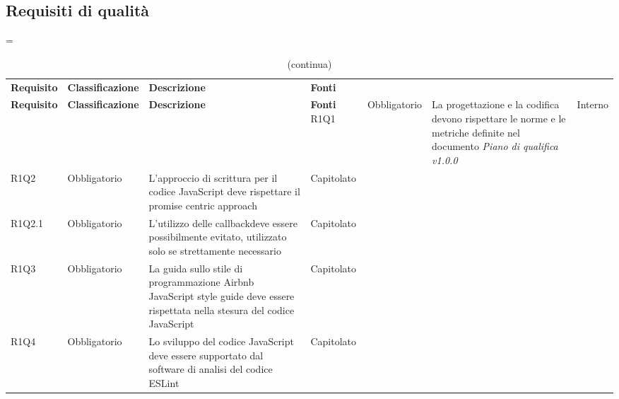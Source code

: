 \subsection{Requisiti di qualità}

\LTcapwidth=\linewidth
\begin{longtable}{ >{\centering}p{} >{\centering}p{}
		>{\raggedright}p{} >{\centering}p{}}
	\caption{Tabella dei requisiti di qualità}\\
	\rowcolorhead 
	\textbf{\color{white}Requisito} 
	& \textbf{\color{white}Classificazione} 
	& \centering\textbf{\color{white}Descrizione}
	& \textbf{\color{white}Fonti} 
	\endfirsthead
	\caption[]{(continua)}\\
	\rowcolorhead 
	\textbf{\color{white}Requisito} 
	& \textbf{\color{white}Classificazione} 
	& \centering\textbf{\color{white}Descrizione}
	& \textbf{\color{white}Fonti} 
	\endhead
	R1Q1	&	Obbligatorio	&	La progettazione e la codifica devono rispettare le norme e le metriche definite nel documento \textit{Piano di qualifica v1.0.0}	&	Interno	\tabularnewline
	R1Q2	&	Obbligatorio	&	L’approccio di scrittura per il codice JavaScript deve rispettare il promise centric approach	&	Capitolato	\tabularnewline
	R1Q2.1	&	Obbligatorio	&	L'utilizzo delle callback\glosp deve essere possibilmente evitato, utilizzato solo se strettamente necessario	&	Capitolato	\tabularnewline
	R1Q3	&	Obbligatorio	&	La guida sullo stile di programmazione Airbnb JavaScript style guide deve essere rispettata nella stesura del codice JavaScript	&	Capitolato	\tabularnewline
	R1Q4	&	Obbligatorio	&	Lo sviluppo del codice JavaScript deve essere supportato dal software di analisi del codice ESLint\glo	&	Capitolato	\tabularnewline
	
\end{longtable}
	

